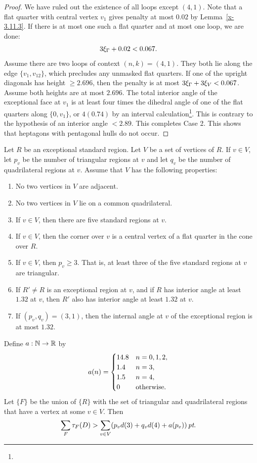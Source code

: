 \begin{proof}
We have ruled out the existence of all loops except $(4,1)$. Note
that a flat quarter with central vertex $v_1$ gives penalty at
most $0.02$ by Lemma~\ref{x-3.11.3}.
  If there is at most one
such a flat quarter and at most one loop, we are done:
$$3\xi_\Gamma + 0.02 < 0.067.$$
Assume there are two loops of context $(n,k)=(4,1)$.  They both
lie along the edge $\{v_1,v_{12}\}$, which precludes any unmasked
flat quarters. If one of the upright diagonals has height
$\ge2.696$, then the penalty is at most $3\xi_\Gamma+3\xi_V< 0.067$.
Assume both heights are at most $2.696$. The total interior angle
of the exceptional face at $v_1$ is at least four times the
dihedral angle of one of the flat quarters along $\{0,v_1\}$, or
$4(0.74)$ by an interval calculation\footnote{}. This is
contrary to the hypothesis of an interior angle $<2.89$.   This
completes Case 2. This shows that heptagons with pentagonal hulls
do not occur.
\end{proof}

\begin{lemma}\label{lemma:excess-1}
Let $R$ be an exceptional standard region.  Let $V$
be a set of vertices of $R$.  If $v\in V$, let $p_v$ be the number
of triangular regions at $v$ and let $q_v$ be the number of
quadrilateral regions at $v$.  Assume that $V$ has the following
properties:
    \begin{enumerate}
        \item No two
        vertices in $V$ are adjacent.
        \item No two vertices
        in $V$ lie on a common quadrilateral.
        \item If $v\in V$, then there are five standard regions at
        $v$.
        \item If $v\in V$, then the corner over $v$ is a central
        vertex of a flat quarter in the cone over $R$.
        \item If $v\in V$, then $p_v\ge 3$.  That is, at least
        three of the five standard regions at $v$ are triangular.
        \item If $R'\ne R$ is an exceptional region at $v$, and if $R$
        has interior angle at least $1.32$ at $v$, then $R'$ also has interior
        angle at least $1.32$ at $v$.
        \item If $(p_v,q_v)=(3,1)$, then the internal angle at $v$ of the exceptional
        region is at most $1.32$.
    \end{enumerate}
  Define $a:{\mathbb N}\to {\mathbb R}$ by
  $$a(n) = \begin{cases}
    14.8 &n=0,1,2,\\
    1.4 & n=3,\\
    1.5 & n=4,\\
    0 & \text{otherwise.}
  \end{cases}
  \index{aZ@$a(n)$}
  $$
Let $\{F\}$ be the union of $\{R\}$ with the set of triangular and
quadrilateral regions that have a vertex at some $v\in V$. Then
    $$\sum_F\tau_F(D) > \sum_{v\in V} (p_v d(3) + q_v d(4) + a
    (p_v))\,\hbox{\it pt}.$$
\end{lemma}

